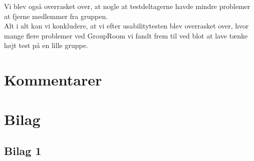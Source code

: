 \documentclass[12pt]{article}
\begin{document}
Vi blev også overrasket over, at nogle at testdeltagerne havde mindre problemer at fjerne medlemmer fra gruppen. \\

Alt i alt kan vi konkludere, at vi efter usabilitytesten blev overrasket over, hvor mange flere problemer ved GroupRoom vi fandt frem til ved blot at lave tænke højt test på en lille gruppe.

\newpage

\section{Kommentarer}



\newpage
\section{Bilag}
\subsection*{Bilag 1}
\end{document}

